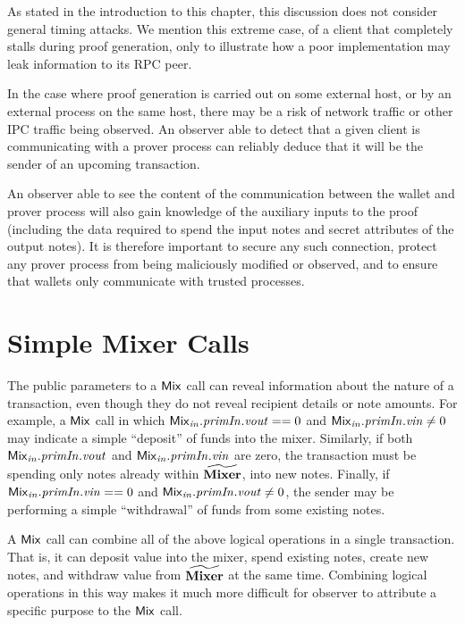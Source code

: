 \begin{notebox}
As stated in the introduction to this chapter, this discussion does not consider general timing attacks. We mention this extreme case, of a client that completely stalls during proof generation, only to illustrate how a poor implementation may leak information to its RPC peer.
\end{notebox}

In the case where proof generation is carried out on some external host, or by an external process on the same host, there may be a risk of network traffic or other IPC traffic being observed. An observer able to detect that a given client is communicating with a prover process can reliably deduce that it will be the sender of an upcoming transaction.

An observer able to see the content of the communication between the wallet and prover process will also gain knowledge of the auxiliary inputs to the proof (including the data required to spend the input notes and secret attributes of the output notes).  It is therefore important to secure any such connection, protect any prover process from being maliciously modified or observed, and to ensure that wallets only communicate with trusted processes.

\section{Simple Mixer Calls}

The public parameters to a $\mathsf{Mix}$ call can reveal information about the nature of a transaction, even though they do not reveal recipient details or note amounts. For example, a $\mathsf{Mix}$ call in which $\mathit{{\mathsf{Mix}}_{in}}.\mathit{primIn}.\mathit{vout} == 0$ and $\mathit{{\mathsf{Mix}}_{in}}.\mathit{primIn}.\mathit{vin} \neq 0$ may indicate a simple ``deposit'' of funds into the mixer.  Similarly, if both $\mathit{{\mathsf{Mix}}_{in}}.\mathit{primIn}.\mathit{vout}$ and $\mathit{{\mathsf{Mix}}_{in}}.\mathit{primIn}.\mathit{vin}$ are zero, the transaction must be spending only notes already within $\widetilde{\mathbf{Mixer}}$, into new notes.  Finally, if $\mathit{{\mathsf{Mix}}_{in}}.\mathit{primIn}.\mathit{vin} == 0$ and $\mathit{{\mathsf{Mix}}_{in}}.\mathit{primIn}.\mathit{vout} \neq 0$, the sender may be performing a simple ``withdrawal'' of funds from some existing notes.

A $\mathsf{Mix}$ call can combine all of the above logical operations in a single transaction. That is, it can deposit value into the mixer, spend existing notes, create new notes, and withdraw value from $\widetilde{\mathbf{Mixer}}$ at the same time.  Combining logical operations in this way makes it much more difficult for observer to attribute a specific purpose to the $\mathsf{Mix}$ call.

